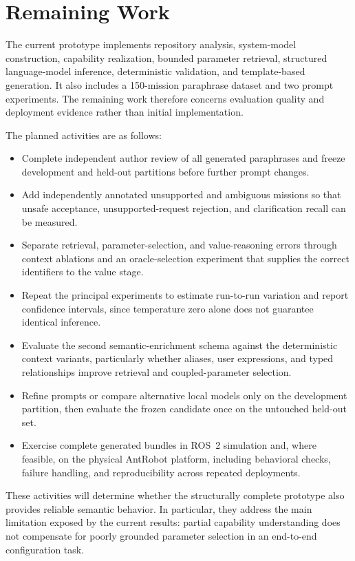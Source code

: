 \chapter{Remaining Work}
The current prototype implements repository analysis, system-model construction, capability realization, bounded parameter retrieval, structured language-model inference, deterministic validation, and template-based generation. It also includes a 150-mission paraphrase dataset and two prompt experiments. The remaining work therefore concerns evaluation quality and deployment evidence rather than initial implementation.

The planned activities are as follows:

\begin{itemize}
    \item Complete independent author review of all generated paraphrases and freeze development and held-out partitions before further prompt changes.
    \item Add independently annotated unsupported and ambiguous missions so that unsafe acceptance, unsupported-request rejection, and clarification recall can be measured.
    \item Separate retrieval, parameter-selection, and value-reasoning errors through context ablations and an oracle-selection experiment that supplies the correct identifiers to the value stage.
    \item Repeat the principal experiments to estimate run-to-run variation and report confidence intervals, since temperature zero alone does not guarantee identical inference.
    \item Evaluate the second semantic-enrichment schema against the deterministic context variants, particularly whether aliases, user expressions, and typed relationships improve retrieval and coupled-parameter selection.
    \item Refine prompts or compare alternative local models only on the development partition, then evaluate the frozen candidate once on the untouched held-out set.
    \item Exercise complete generated bundles in ROS~2 simulation and, where feasible, on the physical AntRobot platform, including behavioral checks, failure handling, and reproducibility across repeated deployments.
\end{itemize}

These activities will determine whether the structurally complete prototype also provides reliable semantic behavior. In particular, they address the main limitation exposed by the current results: partial capability understanding does not compensate for poorly grounded parameter selection in an end-to-end configuration task.


